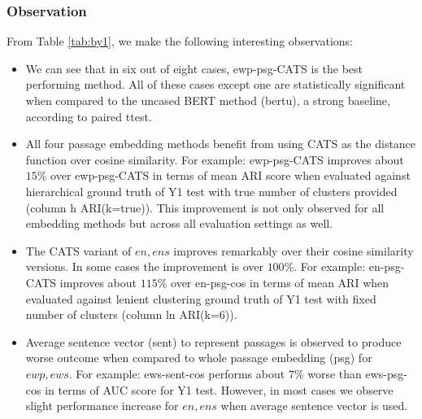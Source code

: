 \subsubsection{Observation} From Table \ref{tab:by1}, we make the following interesting observations:
\begin{itemize}
    \item We can see that in six out of eight cases, ewp-psg-CATS is the best performing method. All of these cases except one are statistically significant when compared to the uncased BERT method (bertu), a strong baseline, according to paired ttest.
    \item All four passage embedding methods benefit from using CATS as the distance function over cosine similarity. For example: ewp-psg-CATS improves about $15$\% over ewp-psg-CATS in terms of mean ARI score when evaluated against hierarchical ground truth of Y1 test with true number of clusters provided (column h ARI(k=true)). This improvement is not only observed for all embedding methods but across all evaluation settings as well.
    \item The CATS variant of $en, ens$ improves remarkably over their cosine similarity versions. In some cases the improvement is over $100$\%. For example: en-psg-CATS improves about $115$\% over en-psg-cos in terms of mean ARI when evaluated against lenient clustering ground truth of Y1 test with fixed number of clusters (column ln ARI(k=6)).
    \item Average sentence vector (sent) to represent passages is observed to produce worse outcome when compared to whole passage embedding (psg) for $ewp, ews$. For example: ews-sent-cos performs about $7$\% worse than ews-psg-cos in terms of AUC score for Y1 test. However, in most cases we observe slight performance increase for $en, ens$ when average sentence vector is used.
\end{itemize}

